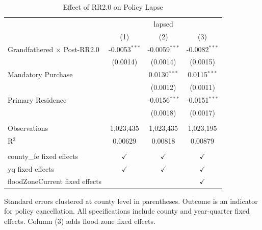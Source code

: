 \begin{table}[htbp]
   \caption{\label{tab:lapse} Effect of RR2.0 on Policy Lapse}
   \bigskip
   \centering
   \begin{tabular}{lccc}
      \toprule
       & \multicolumn{3}{c}{lapsed}\\
                                         & (1)             & (2)             & (3)\\  
      \midrule 
      Grandfathered $\times$ Post-RR2.0  & -0.0053$^{***}$ & -0.0059$^{***}$ & -0.0082$^{***}$\\   
                                         & (0.0014)        & (0.0014)        & (0.0015)\\   
      Mandatory Purchase                 &                 & 0.0130$^{***}$  & 0.0115$^{***}$\\   
                                         &                 & (0.0012)        & (0.0011)\\   
      Primary Residence                  &                 & -0.0156$^{***}$ & -0.0151$^{***}$\\   
                                         &                 & (0.0018)        & (0.0017)\\   
       \\
      Observations                       & 1,023,435       & 1,023,435       & 1,023,195\\  
      R$^2$                              & 0.00629         & 0.00818         & 0.00879\\  
       \\
      county\_fe fixed effects           & $\checkmark$    & $\checkmark$    & $\checkmark$\\   
      yq fixed effects                   & $\checkmark$    & $\checkmark$    & $\checkmark$\\   
      floodZoneCurrent fixed effects     &                 &                 & $\checkmark$\\   
      \bottomrule
   \end{tabular}
   
   \par \raggedright 
   Standard errors clustered at county level in parentheses. Outcome is an indicator for policy cancellation. All specifications include county and year-quarter fixed effects. Column (3) adds flood zone fixed effects.
\end{table}
